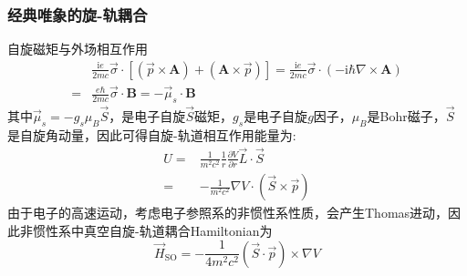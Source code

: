 \frame
{
	\frametitle{经典唯象的旋-轨耦合}
	自旋磁矩与外场相互作用
	\begin{displaymath}
		\begin{aligned}
			&\frac{\mathrm{i}e}{2mc}\vec\sigma\cdot[(\vec p\times\mathbf{A})+(\mathbf{A}\times\vec p)]=\frac{\mathrm{i}e}{2mc}\vec{\sigma}\cdot(-\mathrm{i}\hbar\nabla\times\mathbf{A})\\
			=&\frac{e\hbar}{2mc}\vec{\sigma}\cdot\mathbf{B}=-\vec{\mu}_s\cdot\mathbf{B}
		\end{aligned}
	\end{displaymath}
	其中$\vec \mu_s=-g_s\mu_B\vec S$，是电子自旋$\vec S$磁矩，$g_s$是电子自旋$g$因子，$\mu_B$是\textrm{Bohr}磁子，$\vec S$是自旋角动量，因此可得自旋-轨道相互作用能量为:
	\begin{displaymath}
		\begin{aligned}
			U=&\frac1{m^2c^2}\frac1r\frac{\partial V}{\partial r}\vec L\cdot\vec S\\
			=&-\frac1{m^2c^2}\nabla V\cdot(\vec S\times\vec p)
		\end{aligned}
	\end{displaymath}
	由于电子的高速运动，考虑电子参照系的非惯性系性质，会产生\textrm{Thomas}进动，因此非惯性系中真空自旋-轨道耦合\textrm{Hamiltonian}为
	\begin{displaymath}
		\vec H_{\mathrm{SO}}=-\frac1{4m^2c^2}(\vec S\cdot\vec p)\times\nabla V
	\end{displaymath}
}

